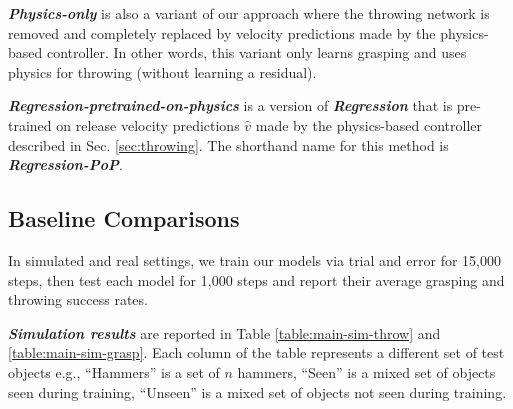 \documentclass[journal]{IEEEtran}
\newcommand{\mypara}[1]{\par\vspace*{0.8mm}\noindent\textbf{\textit{#1}}}
\begin{document}
\mypara{Physics-only} is also a variant of our approach where the throwing network is removed and completely replaced by velocity predictions made by the physics-based controller. In other words, this variant only learns grasping and uses physics for throwing (without learning a residual). 

\mypara{Regression-pretrained-on-physics} is a version of \textbf{\textit{Regression}} that is pre-trained on release velocity predictions $\hat{v}$ made by the physics-based controller described in Sec. \ref{sec:throwing}. The shorthand name for this method is \textbf{\textit{Regression-PoP}}.



\subsection{Baseline Comparisons}
In simulated and real settings, we train our models via trial and error for 15,000 steps, then test each model for 1,000 steps and report their average grasping and throwing success rates. 

\mypara{Simulation results} are reported in Table \ref{table:main-sim-throw} and \ref{table:main-sim-grasp}. Each column of the table represents a different set of test objects e.g., ``Hammers'' is a set of $n$ hammers, ``Seen'' is a mixed set of objects seen during training, ``Unseen'' is a mixed set of objects not seen during training.
\end{document}
